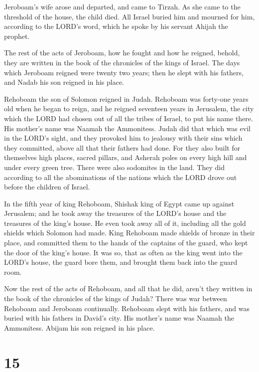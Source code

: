  Jeroboam's wife arose and departed, and came to Tirzah.
As she came to the threshold of the house, the child died.
 All Israel buried him and mourned for him, according to
the LORD's word, which he spoke by his servant Ahijah the prophet.

 The rest of the acts of Jeroboam, how he fought and how
he reigned, behold, they are written in the book of the chronicles of
the kings of Israel.  The days which Jeroboam reigned
were twenty two years; then he slept with his fathers, and Nadab his son
reigned in his place.

 Rehoboam the son of Solomon reigned in Judah. Rehoboam
was forty-one years old when he began to reign, and he reigned seventeen
years in Jerusalem, the city which the LORD had chosen out of all the
tribes of Israel, to put his name there. His mother's name was Naamah
the Ammonitess.  Judah did that which was evil in the
LORD's sight, and they provoked him to jealousy with their sins which
they committed, above all that their fathers had done. 
For they also built for themselves high places, sacred pillars, and
Asherah poles on every high hill and under every green tree.
 There were also sodomites in the land. They did
according to all the abominations of the nations which the LORD drove
out before the children of Israel.

 In the fifth year of king Rehoboam, Shishak king of
Egypt came up against Jerusalem;  and he took away the
treasures of the LORD's house and the treasures of the king's house. He
even took away all of it, including all the gold shields which Solomon
had made.  King Rehoboam made shields of bronze in their
place, and committed them to the hands of the captains of the guard, who
kept the door of the king's house.  It was so, that as
often as the king went into the LORD's house, the guard bore them, and
brought them back into the guard room.

 Now the rest of the acts of Rehoboam, and all that he
did, aren't they written in the book of the chronicles of the kings of
Judah?  There was war between Rehoboam and Jeroboam
continually.  Rehoboam slept with his fathers, and was
buried with his fathers in David's city. His mother's name was Naamah
the Ammonitess. Abijam his son reigned in his place.

\hypertarget{section-14}{%
\section{15}\label{section-14}}

